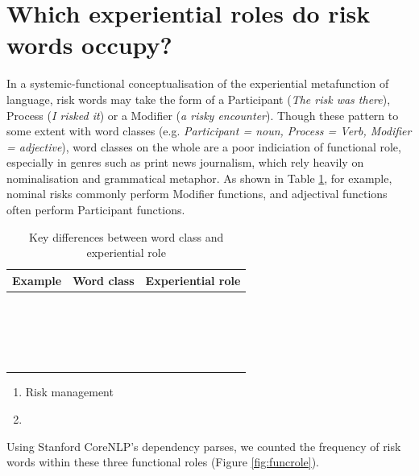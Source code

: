 	\section{Which experiential roles do risk words occupy?} 
	\FloatBarrier


    In a systemic-functional conceptualisation of the experiential metafunction of language, risk words may take the form of a Participant (\emph{The risk was there}), Process (\emph{I risked it}) or a Modifier (\emph{a risky encounter}). Though these pattern to some extent with word classes (e.g. \emph{Participant = noun, Process = Verb, Modifier = adjective}), word classes on the whole are a poor indiciation of functional role, especially in genres such as print news journalism, which rely heavily on nominalisation and grammatical metaphor. As shown in Table \ref{tab:class_and_role}, for example, nominal risks commonly perform Modifier functions, and adjectival functions often perform Participant functions.

            \begin{table}
            \small
            \centering
            \begin{tabular}{|l|l|l|}
            \hline
            \textbf{Example}       & \textbf{Word class}     & \textbf{Experiential role}     \\ \hline
            ~  &  &     \\ \hline
            ~  &  &     \\ \hline
            ~  &  &     \\ \hline
            ~  &  &     \\ \hline
            \end{tabular}
            \caption{Key differences between word class and experiential role}
            \label{tab:class_and_role}
            \end{table}



    \begin{enumerate} [before=\itshape,font=\normalfont]  \setlength\itemsep{0em} \small
        \item Risk management
        \item 
    \end{enumerate}

    Using Stanford CoreNLP's dependency parses, we counted the frequency of risk words within these three functional roles (Figure \ref{fig:funcrole}). 


